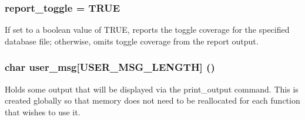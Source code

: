 \subsubsection{ report\_\-toggle = TRUE}\label{report_8c_a2}


If set to a boolean value of TRUE, reports the toggle coverage for the specified database file; otherwise, omits toggle coverage from the report output. 
\subsubsection{\setlength{\rightskip}{0pt plus 5cm}char user\_\-msg[USER\_\-MSG\_\-LENGTH] ()}\label{report_8c_a0}


Holds some output that will be displayed via the print\_\-output command. This is created globally so that memory does not need to be reallocated for each function that wishes to use it. 
